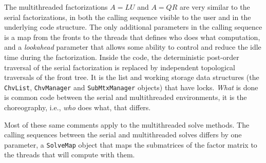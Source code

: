 \par
The multithreaded factorizations $A = LU$ and $A = QR$
are very similar to the serial factorizations, 
in both the calling sequence visible to the user and
in the underlying code structure.
The only additional parameters in the calling sequence is a map
from the fronts to the threads that defines who does what
computation, and a {\it lookahead} parameter that allows some
ability to control and reduce the idle time during the factorization.
Inside the code, the deterministic post-order traversal of the
serial factorization is replaced by independent topological
traversals of the front tree.
It is the list and working storage data structures 
(the {\tt ChvList}, {\tt ChvManager} and {\tt SubMtxManager} objects)
that have locks.
{\it What} is done is common code between the serial and
multithreaded environments, it is the choreography, i.e.,
{\it who} does what, that differs.
\par
Most of these same comments apply to the multithreaded solve methods.
The calling sequences between the serial and multithreaded solves
differs by one parameter, a {\tt SolveMap} object that maps the
submatrices of the factor matrix to the threads that will compute
with them.
